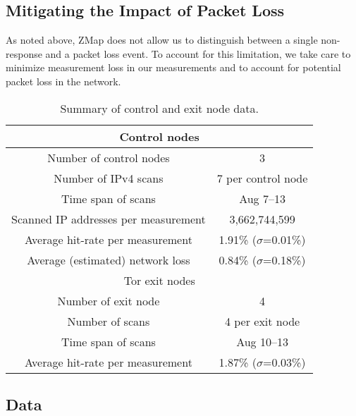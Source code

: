 \documentclass[12pt]{spieman}
\begin{document}
\begin{spacing}{2}
\subsection{Mitigating the Impact of Packet Loss}

As noted above, ZMap does not allow us to distinguish between a single non-response and a packet loss event. To account for this limitation, we take care to minimize measurement loss in our measurements and to account for potential packet loss in the network. 

\begin{table}[ht]
\caption{Summary of control and exit node data.} 
\label{tab:1}
\begin{center}      
\begin{tabular}{|c|c|}
\hline
\multicolumn{2}{|c|}{\rule[-1ex]{0pt}{3.5ex} Control nodes}  \\
\hline
\rule[-1ex]{0pt}{3.5ex}  Number of control nodes & 3  \\
\hline
\rule[-1ex]{0pt}{3.5ex}  Number of IPv4 scans & 7 per control node   \\
\hline
\rule[-1ex]{0pt}{3.5ex}  Time span of scans & Aug 7–13   \\
\hline
\rule[-1ex]{0pt}{3.5ex}  Scanned IP addresses per measurement & 3,662,744,599  \\
\hline
\rule[-1ex]{0pt}{3.5ex}  Average hit-rate per measurement & 1.91\% ($\sigma$=0.01\%)  \\
\hline
\rule[-1ex]{0pt}{3.5ex}  Average (estimated) network loss & 0.84\% ($\sigma$=0.18\%)  \\
\hline
\multicolumn{2}{|c|}{\rule[-1ex]{0pt}{3.5ex} Tor exit nodes}  \\
\hline
\rule[-1ex]{0pt}{3.5ex}  Number of exit node & 4  \\
\hline
\rule[-1ex]{0pt}{3.5ex}  Number of scans & 4 per exit node \\
\hline
\rule[-1ex]{0pt}{3.5ex}  Time span of scans & Aug 10–13 \\
\hline 
\hline
\rule[-1ex]{0pt}{3.5ex}  Average hit-rate per measurement & 1.87\% ($\sigma$=0.03\%) \\
\hline 
\end{tabular}
\end{center}
\end{table} 

\subsection{Data}


\end{spacing}
\end{document}
